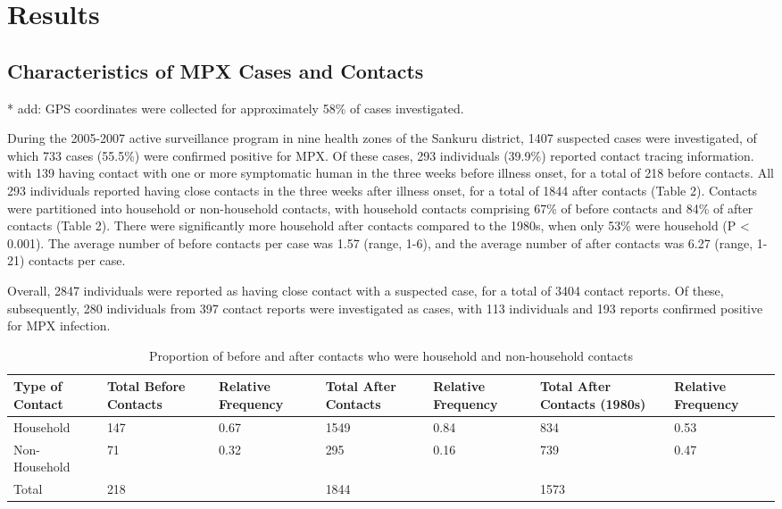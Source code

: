 \section{Results}

\subsection{Characteristics of MPX Cases and Contacts}

* add: GPS coordinates were collected for approximately 58\% of cases investigated. 

During the 2005-2007 active surveillance program in nine health zones of the Sankuru district, 1407 suspected cases were investigated, of which 733 cases (55.5\%) were confirmed positive for MPX. Of these cases, 293 individuals (39.9\%) reported contact tracing information. with 139 having contact with one or more symptomatic human in the three weeks before illness onset, for a total of 218 before contacts. All 293 individuals reported having close contacts in the three weeks after illness onset, for a total of 1844 after contacts (Table 2). Contacts were partitioned into household or non-household contacts, with household contacts comprising 67\% of before contacts and 84\% of after contacts (Table 2). There were significantly more household after contacts compared to the 1980s, when only 53\% were household (P < 0.001). The average number of before contacts per case was 1.57 (range, 1-6), and the average number of after contacts was 6.27 (range, 1-21) contacts per case. 

Overall, 2847 individuals were reported as having close contact with a suspected case, for a total of 3404 contact reports. Of these, 
subsequently, 280 individuals from 397 contact reports were investigated as cases, with 113 individuals and 193 reports confirmed positive for MPX infection. 

\begin{table}[!h]
\begin{tabular}{lp{1.4cm}p{1.4cm}p{1.4cm}p{1.4cm}p{1.4cm}p{1.4cm}} 
\toprule
Type of Contact & Total Before Contacts & Relative Frequency &	Total After Contacts &	Relative Frequency & Total After Contacts (1980s) & Relative Frequency \\
\midrule
Household & 147 & 0.67 & 1549 &	0.84 & 834 & 0.53 \\
Non-Household &	71 & 0.32 &	295	& 0.16 & 739 & 0.47 \\
\midrule
Total &	218	& &	1844 &	& 1573 & \\
\bottomrule
\end{tabular}
\caption{Proportion of before and after contacts who were household and non-household contacts}
\label{tab:table1}
\end{table}


